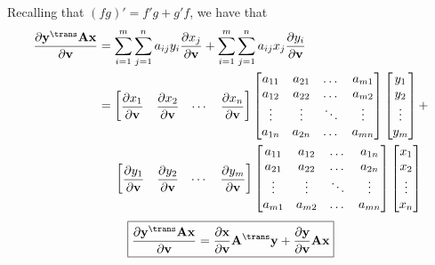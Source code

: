 Recalling that \((fg)' = f'g + g'f\), we have that
\begin{align}
    \dfrac{\partial \mathbf{y}^\trans \mathbf{A} \mathbf{x}}{\partial \mathbf{v}} & = \sum_{i = 1}^{m}\sum_{j = 1}^{n} a_{ij} y_{i} \dfrac{\partial x_{j}}{\partial \mathbf{v}} + \sum_{i = 1}^{m}\sum_{j = 1}^{n} a_{ij} x_{j} \dfrac{\partial y_{i}}{\partial \mathbf{v}} \\
    & = \begin{bmatrix}
        \dfrac{\partial x_1}{\partial \mathbf{v}} & \dfrac{\partial x_2}{\partial \mathbf{v}} & \cdots & \dfrac{\partial x_n}{\partial \mathbf{v}}
    \end{bmatrix}
    \begin{bmatrix}
        a_{11} & a_{21} & \dots & a_{m1} \\
        a_{12} & a_{22} & \dots & a_{m2} \\
        \vdots & \vdots & \ddots & \vdots \\
        a_{1n} & a_{2n} & \dots & a_{mn} \\
    \end{bmatrix}
    \begin{bmatrix}
        y_1 \\
        y_2 \\
        \vdots \\
        y_m
    \end{bmatrix} + \\
    & \hspace{3ex} \begin{bmatrix}
        \dfrac{\partial y_1}{\partial \mathbf{v}} & \dfrac{\partial y_2}{\partial \mathbf{v}} & \cdots & \dfrac{\partial y_m}{\partial \mathbf{v}}
    \end{bmatrix}
    \begin{bmatrix}
        a_{11} & a_{12} & \dots & a_{1n} \\
        a_{21} & a_{22} & \dots & a_{2n} \\
        \vdots & \vdots & \ddots & \vdots \\
        a_{m1} & a_{m2} & \dots & a_{mn} \\
    \end{bmatrix}
    \begin{bmatrix}
        x_1 \\
        x_2 \\
        \vdots \\
        x_n
    \end{bmatrix}
\end{align}
\begin{align}
    \boxed{\dfrac{\partial \mathbf{y}^\trans \mathbf{A} \mathbf{x}}{\partial \mathbf{v}} = \dfrac{\partial \mathbf{x}}{\partial \mathbf{v}} \mathbf{A}^{\trans} \mathbf{y} + \dfrac{\partial \mathbf{y}}{\partial \mathbf{v}} \mathbf{A} \mathbf{x}}
\end{align}

